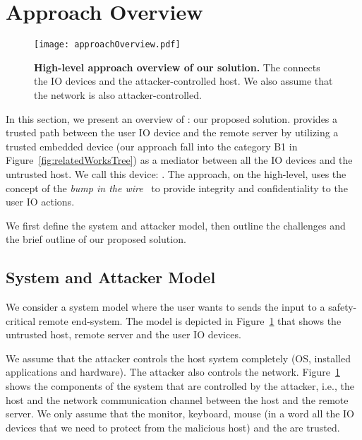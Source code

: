 \section{\name Approach Overview}
\label{sec:approach}


\begin{figure}[t]
\centering
\texttt{[image: approachOverview.pdf]}
\caption{\textbf{High-level approach overview of our solution.}  The \device connects the IO devices and the attacker-controlled host. We also assume that the network is also attacker-controlled.}
\spacesave
\label{fig:approachOverview}
\centering
\end{figure}


In this section, we present an overview of \name: our proposed solution. \name provides a trusted path between the user IO device and the remote server by utilizing a trusted embedded device (our approach fall into the category B1 in Figure~\ref{fig:relatedWorksTree}) as a mediator between all the IO devices and the untrusted host. We call this device: \device. The approach, on the high-level, uses the concept of the \emph{bump in the wire}~\cite{McCPerRei2006} to provide integrity and confidentiality to the user IO actions.  %

We first define the system and attacker model, then outline the challenges and the brief outline of our proposed solution.



\subsection{System and Attacker Model}
\label{sec:approach:systemAttackerModel}

We consider a system model where the user wants to sends the input to a safety-critical remote end-system. The model is depicted in Figure~\ref{fig:approachOverview} that shows the untrusted host, remote server and the user IO devices. 

We assume that the attacker controls the host system completely (OS, installed applications and hardware). The attacker also controls the network. %
Figure~\ref{fig:approachOverview} shows the components of the system that are controlled by the attacker, i.e., the host and the network communication channel between the host and the remote server. We only assume that the monitor, keyboard, mouse (in a word all the IO devices that we need to protect from the malicious host) and the \device are trusted.

